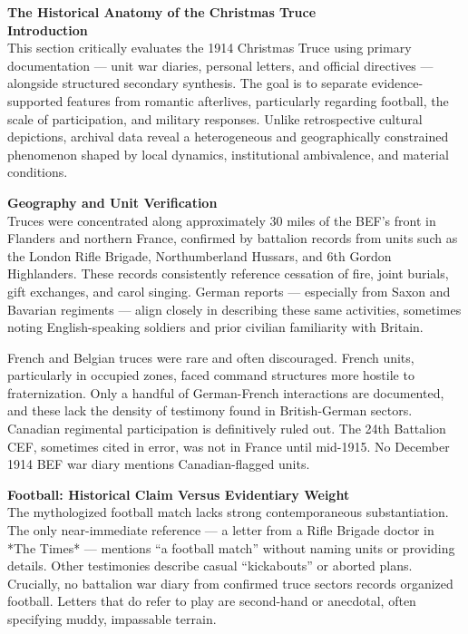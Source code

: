 \begin{technical}
{\Large\textbf{The Historical Anatomy of the Christmas Truce}}\\[0.7em]

\noindent\textbf{Introduction}\\[0.5em]
This section critically evaluates the 1914 Christmas Truce using primary documentation — unit war diaries, personal letters, and official directives — alongside structured secondary synthesis. The goal is to separate evidence-supported features from romantic afterlives, particularly regarding football, the scale of participation, and military responses. Unlike retrospective cultural depictions, archival data reveal a heterogeneous and geographically constrained phenomenon shaped by local dynamics, institutional ambivalence, and material conditions.

\noindent\textbf{Geography and Unit Verification}\\[0.5em]
Truces were concentrated along approximately 30 miles of the BEF’s front in Flanders and northern France, confirmed by battalion records from units such as the London Rifle Brigade, Northumberland Hussars, and 6th Gordon Highlanders. These records consistently reference cessation of fire, joint burials, gift exchanges, and carol singing. German reports — especially from Saxon and Bavarian regiments — align closely in describing these same activities, sometimes noting English-speaking soldiers and prior civilian familiarity with Britain.

French and Belgian truces were rare and often discouraged. French units, particularly in occupied zones, faced command structures more hostile to fraternization. Only a handful of German-French interactions are documented, and these lack the density of testimony found in British-German sectors. Canadian regimental participation is definitively ruled out. The 24th Battalion CEF, sometimes cited in error, was not in France until mid-1915. No December 1914 BEF war diary mentions Canadian-flagged units.

\noindent\textbf{Football: Historical Claim Versus Evidentiary Weight}\\[0.5em]
The mythologized football match lacks strong contemporaneous substantiation. The only near-immediate reference — a letter from a Rifle Brigade doctor in *The Times* — mentions “a football match” without naming units or providing details. Other testimonies describe casual “kickabouts” or aborted plans. Crucially, no battalion war diary from confirmed truce sectors records organized football. Letters that do refer to play are second-hand or anecdotal, often specifying muddy, impassable terrain.


\end{technical}
